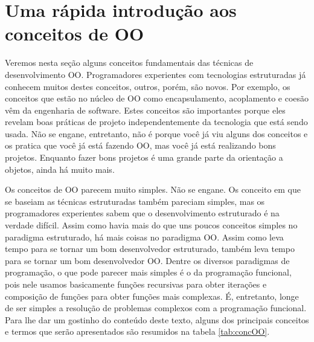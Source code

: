 \documentclass[
	11pt,				%
	openright,
	twoside,			%
	a4paper,			%
	english,			%
	french,
	brazil,				%
	sumario=tradicional
	]{abntex2}
\begin{document}
\section{Uma rápida introdução aos conceitos de OO}

Veremos nesta seção alguns conceitos fundamentais das técnicas de desenvolvimento OO. Programadores experientes com tecnologias estruturadas já conhecem muitos destes conceitos, outros, porém, são novos. Por exemplo, os conceitos que estão no núcleo de OO como encapsulamento, acoplamento e coesão vêm da engenharia de software. Estes conceitos são importantes porque eles revelam boas práticas de projeto independentemente da tecnologia que está sendo usada. Não se engane, entretanto, não é porque você já viu alguns dos conceitos e os pratica que você já está fazendo OO, mas você já está realizando bons projetos. Enquanto fazer bons projetos é uma grande parte da orientação a objetos, ainda há muito mais.

Os conceitos de OO parecem muito simples. Não se engane. Os conceito em que se baseiam as técnicas estruturadas também pareciam simples, mas os programadores experientes sabem que o desenvolvimento estruturado é na verdade difícil. Assim como havia mais do que uns poucos conceitos simples no paradigma estruturado, há mais coisas no paradigma OO. Assim como leva tempo para se tornar um bom desenvolvedor estruturado, também leva tempo para se tornar um bom desenvolvedor OO. Dentre os diversos paradigmas de programação, o que pode parecer mais simples é o da programação funcional, pois nele usamos basicamente funções recursivas para obter iterações e composição de funções para obter funções mais complexas. É, entretanto, longe de ser simples a resolução de problemas complexos com a programação funcional. Para lhe dar um gostinho do conteúdo deste texto, alguns dos principais conceitos e termos que serão apresentados são resumidos na tabela \ref{tab:concOO}.
\end{document}
